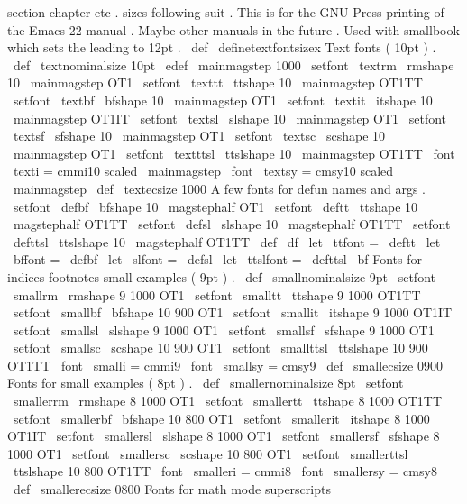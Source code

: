 {{{section
chapter
etc
.
sizes
following
suit
.
This
is
for
the
GNU
%
Press
printing
of
the
Emacs
22
manual
.
Maybe
other
manuals
in
the
%
future
.
Used
with
smallbook
which
sets
the
leading
to
12pt
.
%
\
def
\
definetextfontsizex
{
%
%
Text
fonts
(
10pt
)
.
\
def
\
textnominalsize
{
10pt
}
\
edef
\
mainmagstep
{
1000
}
\
setfont
\
textrm
\
rmshape
{
10
}
{
\
mainmagstep
}
{
OT1
}
\
setfont
\
texttt
\
ttshape
{
10
}
{
\
mainmagstep
}
{
OT1TT
}
\
setfont
\
textbf
\
bfshape
{
10
}
{
\
mainmagstep
}
{
OT1
}
\
setfont
\
textit
\
itshape
{
10
}
{
\
mainmagstep
}
{
OT1IT
}
\
setfont
\
textsl
\
slshape
{
10
}
{
\
mainmagstep
}
{
OT1
}
\
setfont
\
textsf
\
sfshape
{
10
}
{
\
mainmagstep
}
{
OT1
}
\
setfont
\
textsc
\
scshape
{
10
}
{
\
mainmagstep
}
{
OT1
}
\
setfont
\
textttsl
\
ttslshape
{
10
}
{
\
mainmagstep
}
{
OT1TT
}
\
font
\
texti
=
cmmi10
scaled
\
mainmagstep
\
font
\
textsy
=
cmsy10
scaled
\
mainmagstep
\
def
\
textecsize
{
1000
}
%
A
few
fonts
for
defun
names
and
args
.
\
setfont
\
defbf
\
bfshape
{
10
}
{
\
magstephalf
}
{
OT1
}
\
setfont
\
deftt
\
ttshape
{
10
}
{
\
magstephalf
}
{
OT1TT
}
\
setfont
\
defsl
\
slshape
{
10
}
{
\
magstephalf
}
{
OT1TT
}
\
setfont
\
defttsl
\
ttslshape
{
10
}
{
\
magstephalf
}
{
OT1TT
}
\
def
\
df
{
\
let
\
ttfont
=
\
deftt
\
let
\
bffont
=
\
defbf
\
let
\
slfont
=
\
defsl
\
let
\
ttslfont
=
\
defttsl
\
bf
}
%
Fonts
for
indices
footnotes
small
examples
(
9pt
)
.
\
def
\
smallnominalsize
{
9pt
}
\
setfont
\
smallrm
\
rmshape
{
9
}
{
1000
}
{
OT1
}
\
setfont
\
smalltt
\
ttshape
{
9
}
{
1000
}
{
OT1TT
}
\
setfont
\
smallbf
\
bfshape
{
10
}
{
900
}
{
OT1
}
\
setfont
\
smallit
\
itshape
{
9
}
{
1000
}
{
OT1IT
}
\
setfont
\
smallsl
\
slshape
{
9
}
{
1000
}
{
OT1
}
\
setfont
\
smallsf
\
sfshape
{
9
}
{
1000
}
{
OT1
}
\
setfont
\
smallsc
\
scshape
{
10
}
{
900
}
{
OT1
}
\
setfont
\
smallttsl
\
ttslshape
{
10
}
{
900
}
{
OT1TT
}
\
font
\
smalli
=
cmmi9
\
font
\
smallsy
=
cmsy9
\
def
\
smallecsize
{
0900
}
%
Fonts
for
small
examples
(
8pt
)
.
\
def
\
smallernominalsize
{
8pt
}
\
setfont
\
smallerrm
\
rmshape
{
8
}
{
1000
}
{
OT1
}
\
setfont
\
smallertt
\
ttshape
{
8
}
{
1000
}
{
OT1TT
}
\
setfont
\
smallerbf
\
bfshape
{
10
}
{
800
}
{
OT1
}
\
setfont
\
smallerit
\
itshape
{
8
}
{
1000
}
{
OT1IT
}
\
setfont
\
smallersl
\
slshape
{
8
}
{
1000
}
{
OT1
}
\
setfont
\
smallersf
\
sfshape
{
8
}
{
1000
}
{
OT1
}
\
setfont
\
smallersc
\
scshape
{
10
}
{
800
}
{
OT1
}
\
setfont
\
smallerttsl
\
ttslshape
{
10
}
{
800
}
{
OT1TT
}
\
font
\
smalleri
=
cmmi8
\
font
\
smallersy
=
cmsy8
\
def
\
smallerecsize
{
0800
}
%
Fonts
for
math
mode
superscripts
}}}}
